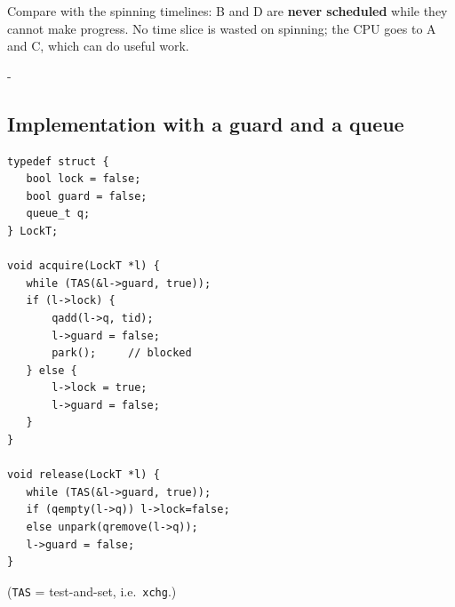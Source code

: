 \documentclass[11pt,a4paper]{article}
\makeatletter
\newcommand{\keepspace}[1]{\par\penalty-100\begingroup
  \setlength{\dimen@}{#1}\dimen@ii\pagegoal\advance\dimen@ii-\pagetotal
  \ifdim\dimen@>\dimen@ii\ifdim\dimen@ii>\z@\vfil\fi\break\fi\endgroup}
\newcommand{\blk}[5]{\draw[#4] (#1,0) rectangle (#2,1);
  \node[text=#5, font=\scriptsize\bfseries] at ({(#1+#2)/2},0.5) {#3};}
\newcommand{\ev}[2]{\node[font=\tiny, align=center, above] (e) at (#1,1.35) {#2};
  \draw[-{Latex[length=1.2mm]}] (#1,1.38) -- (#1,1.02);}
\newcommand{\taxis}{\draw (0,-0.05) -- (160,-0.05);
  \foreach \t in {0,20,...,160} { \draw (\t,-0.05) -- (\t,-0.2); \node[below] at (\t,-0.15) {\t}; }}
\makeatother
\begin{document}
\begin{center}
\end{center}

Compare with the spinning timelines: B and D are \textbf{never scheduled}
while they cannot make progress. No time slice is wasted on spinning; the
CPU goes to A and C, which can do useful work.

\keepspace{30\baselineskip}
\subsection{Implementation with a guard and a queue}

\begin{lstlisting}
typedef struct {
   bool lock = false;
   bool guard = false;
   queue_t q;
} LockT;

void acquire(LockT *l) {
   while (TAS(&l->guard, true));
   if (l->lock) {
       qadd(l->q, tid);
       l->guard = false;
       park();     // blocked
   } else {
       l->lock = true;
       l->guard = false;
   }
}

void release(LockT *l) {
   while (TAS(&l->guard, true));
   if (qempty(l->q)) l->lock=false;
   else unpark(qremove(l->q));
   l->guard = false;
}
\end{lstlisting}

(\texttt{TAS} = test-and-set, i.e.\ \texttt{xchg}.)
\end{document}
